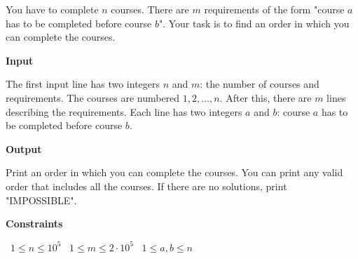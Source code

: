 You have to complete $n$ courses. There are $m$ requirements of the form "course $a$ has to be completed before course $b$". Your task is to find an order in which you can complete the courses.

\vspace{0.3cm}\noindent\textbf{Input}

The first input line has two integers $n$ and $m$: the number of courses and requirements. The courses are numbered $1,2,\dots,n$.
After this, there are $m$ lines describing the requirements. Each line has two integers $a$ and $b$: course $a$ has to be completed before course $b$.

\vspace{0.3cm}\noindent\textbf{Output}

Print an order in which you can complete the courses. You can print any valid order that includes all the courses.
If there are no solutions, print "IMPOSSIBLE".

\vspace{0.3cm}\noindent\textbf{Constraints}

\textbullet\ $1 \le n \le 10^5$
\textbullet\ $1 \le m \le 2 \cdot 10^5$
\textbullet\ $1 \le a,b \le n$